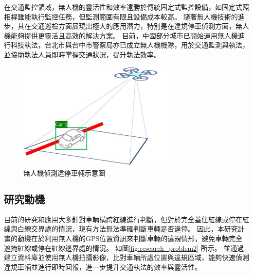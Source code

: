 \documentclass[12pt]{article}       %
\renewcommand{\figurename}{圖}                           %
\begin{document}
在交通監控領域，無人機的靈活性和效率遠勝於傳統固定式監控設備，如固定式照相桿雖能執行監控任務，但監測範圍有限且設備成本較高。
隨著無人機技術的進步，其在交通巡檢方面展現出極大的應用潛力，特別是在違規停車偵測方面，無人機能夠提供更靈活且高效的解決方案。
目前，中國部分城市已開始運用無人機進行科技執法\cite{chinatimes2019}，台北市與台中市警察局亦已成立無人機機隊\cite{cna_2022}\cite{tai_2021}，用於交通監測與執法，並協助執法人員即時掌握交通狀況，提升執法效率。

\begin{figure}[H]
    \centering
    \renewcommand{\figurename}{圖} %
    \includegraphics[width=0.7\textwidth]{research_problem1.jpg}     %
    \caption{無人機偵測違停車輛示意圖}    %
    \label{fig:research_problem1}    %
\end{figure}

\subsection{研究動機} 
\hspace{2em}目前的研究和應用大多針對車輛橫跨紅線進行判斷，但對於完全蓋住紅線或停在紅線與白線交界處的情況，現有方法無法準確判斷車輛是否違停。
因此，本研究計畫的動機在於利用無人機的GPS位置資訊來判斷車輛的違規情形，避免車輛完全遮掩紅線或停在紅線邊界處的情況。
如圖\ref{fig:research_problem2} 所示。
並通過建立資料庫並使用無人機拍攝影像，比對車輛所處位置與違規區域，能夠快速偵測違規車輛並進行即時回報，進一步提升交通執法的效率與靈活性。
\end{document}
